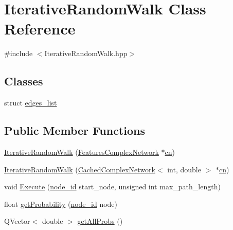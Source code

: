 \hypertarget{class_iterative_random_walk}{\section{Iterative\+Random\+Walk Class Reference}
\label{class_iterative_random_walk}
}


{\ttfamily \#include $<$Iterative\+Random\+Walk.\+hpp$>$}

\subsection*{Classes}
\begin{DoxyCompactItemize}
\item 
struct \hyperlink{struct_iterative_random_walk_1_1edges__list}{edges\+\_\+list}
\end{DoxyCompactItemize}
\subsection*{Public Member Functions}
\begin{DoxyCompactItemize}
\item 
\hyperlink{class_iterative_random_walk_a7b012f39baa0fc34f0275a3ff9f91895}{Iterative\+Random\+Walk} (\hyperlink{class_features_complex_network}{Features\+Complex\+Network} $\ast$\hyperlink{class_iterative_random_walk_ab63a2f748e5f6a9753697259cbfa2c6f}{cn})
\item 
\hyperlink{class_iterative_random_walk_a5f2c5b8b0fea93b099552fe4349c4663}{Iterative\+Random\+Walk} (\hyperlink{class_cached_complex_network}{Cached\+Complex\+Network}$<$ int, double $>$ $\ast$\hyperlink{class_iterative_random_walk_ab63a2f748e5f6a9753697259cbfa2c6f}{cn})
\item 
void \hyperlink{class_iterative_random_walk_a7f87d1012ed90935145b4df1f869b643}{Execute} (\hyperlink{_complex_network_8hpp_a8323334ca788fde39682469321590d52}{node\+\_\+id} start\+\_\+node, unsigned int max\+\_\+path\+\_\+length)
\item 
float \hyperlink{class_iterative_random_walk_a653857e8ad309943cbdb9e6a2f994f59}{get\+Probability} (\hyperlink{_complex_network_8hpp_a8323334ca788fde39682469321590d52}{node\+\_\+id} node)
\item 
Q\+Vector$<$ double $>$ \hyperlink{class_iterative_random_walk_a621c72b1e287ed0a36b301493b2f5f70}{get\+All\+Probs} ()
\end{DoxyCompactItemize}
